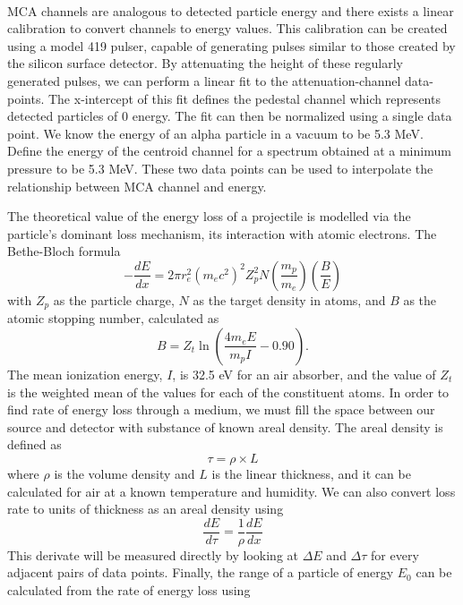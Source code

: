 \documentclass[12pt]{article}
\begin{document}
\begin{multicols}{2}
    \paragraph{} MCA channels are analogous to detected particle energy and there exists a linear calibration to convert channels to energy values. This calibration can be created using a model 419 pulser, capable of generating pulses similar to those created by the silicon surface detector. By attenuating the height of these regularly generated pulses, we can perform a linear fit to the attenuation-channel data-points. The x-intercept of this fit defines the pedestal channel which represents detected particles of 0 energy. The fit can then be normalized using a single data point. We know the energy of an alpha particle in a vacuum to be 5.3 MeV. Define the energy of the centroid channel for a spectrum obtained at a minimum pressure to be 5.3 MeV. These two data points can be used to interpolate the relationship between MCA channel and energy. \cite{kovash}

    The theoretical value of the energy loss of a projectile is modelled via the particle's dominant loss mechanism, its interaction with atomic electrons. The Bethe-Bloch formula
    \begin{equation}
        -\frac{dE}{dx} = 2\pi r_e^2(m_ec^2)^2Z_p^2N\left(\frac{m_p}{m_e}\right)\left(\frac{B}{E}\right)
        \label{bethebloch}
    \end{equation}
    with $Z_p$ as the particle charge, $N$ as the target density in atoms, and $B$ as the atomic stopping number, calculated as
    $$B = Z_t\ln\left(\frac{4m_eE}{m_pI} - 0.90\right).$$
    The mean ionization energy, $I$, is 32.5 eV for an air absorber, and the value of $Z_t$ is the weighted mean of the values for each of the constituent atoms.
    In order to find rate of energy loss through a medium, we must fill the space between our source and detector with substance of known areal density. The areal density is defined as
    \begin{equation}
        \tau = \rho \times L
        \label{areal}
    \end{equation}
    where $\rho$ is the volume density and $L$ is the linear thickness, and it can be calculated for air at a known temperature and humidity. We can also convert loss rate to units of thickness as an areal density using 
    \begin{equation}
        \frac{dE}{d\tau} = \frac{1}{\rho}\frac{dE}{dx}
        \label{arealConversion}
    \end{equation}
    This derivate will be measured directly by looking at $\Delta E$ and $\Delta \tau$ for every adjacent pairs of data points.
    Finally, the range of a particle of energy $E_0$ can be calculated from the rate of energy loss using 
    

\end{multicols}
\end{document}
